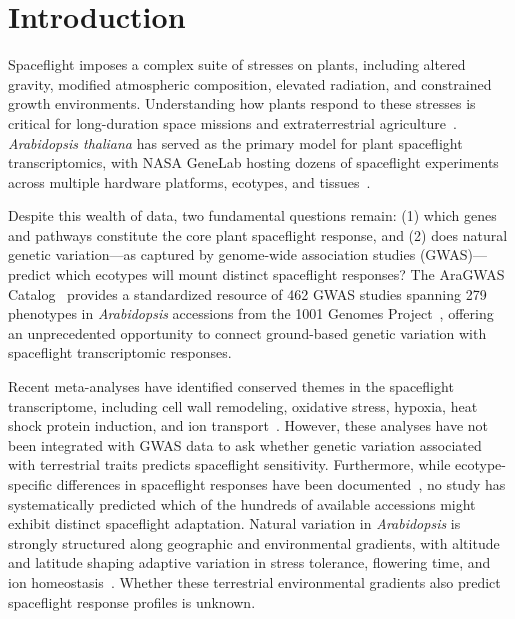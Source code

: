 \documentclass[sn-mathphys-num,Basic]{sn-jnl}
\begin{document}

\mainmatter

\section{Introduction}

Spaceflight imposes a complex suite of stresses on plants, including altered gravity, modified atmospheric composition, elevated radiation, and constrained growth environments. Understanding how plants respond to these stresses is critical for long-duration space missions and extraterrestrial agriculture~\cite{Barker2023,Kruse2020}. \textit{Arabidopsis thaliana} has served as the primary model for plant spaceflight transcriptomics, with NASA GeneLab hosting dozens of spaceflight experiments across multiple hardware platforms, ecotypes, and tissues~\cite{Paul2013,Johnson2017,Paul2017}.

Despite this wealth of data, two fundamental questions remain: (1) which genes and pathways constitute the core plant spaceflight response, and (2) does natural genetic variation---as captured by genome-wide association studies (GWAS)---predict which ecotypes will mount distinct spaceflight responses? The AraGWAS Catalog~\cite{Togninalli2017,Togninalli2019} provides a standardized resource of 462 GWAS studies spanning 279 phenotypes in \textit{Arabidopsis} accessions from the 1001 Genomes Project~\cite{AlonsoBlanco2016}, offering an unprecedented opportunity to connect ground-based genetic variation with spaceflight transcriptomic responses.

Recent meta-analyses have identified conserved themes in the spaceflight transcriptome, including cell wall remodeling, oxidative stress, hypoxia, heat shock protein induction, and ion transport~\cite{Barker2023,Choi2019}. However, these analyses have not been integrated with GWAS data to ask whether genetic variation associated with terrestrial traits predicts spaceflight sensitivity. Furthermore, while ecotype-specific differences in spaceflight responses have been documented~\cite{Paul2017,Choi2019}, no study has systematically predicted which of the hundreds of available accessions might exhibit distinct spaceflight adaptation. Natural variation in \textit{Arabidopsis} is strongly structured along geographic and environmental gradients, with altitude and latitude shaping adaptive variation in stress tolerance, flowering time, and ion homeostasis~\cite{FerreroSerrano2019,ExpositoAlonso2019}. Whether these terrestrial environmental gradients also predict spaceflight response profiles is unknown.
\end{document}
